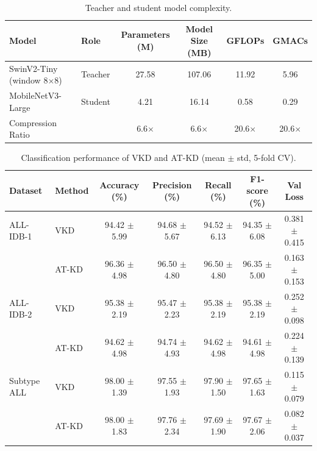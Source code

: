 \documentclass[preprint,review,12pt]{elsarticle}
\begin{document}
\begin{table}[tbp]
\centering
\caption{Teacher and student model complexity.}
\label{tab:complexity}
\footnotesize
\renewcommand{\arraystretch}{1.2}
\setlength{\tabcolsep}{3pt}
\begin{tabular}{l l c c c c}
\toprule
\textbf{Model} & \textbf{Role} & \textbf{Parameters (M)} & \textbf{Model Size (MB)} & \textbf{GFLOPs} & \textbf{GMACs} \\
\midrule
SwinV2-Tiny (window 8$\times$8) & Teacher & 27.58 & 107.06 & 11.92 & 5.96 \\
MobileNetV3-Large & Student & 4.21 & 16.14 & 0.58 & 0.29 \\
Compression Ratio &  & 6.6$\times$ & 6.6$\times$ & 20.6$\times$ & 20.6$\times$ \\
\bottomrule
\end{tabular}
\end{table}
\begin{table}[tbp]
\centering
\caption{Classification performance of VKD and AT-KD (mean $\pm$ std, 5-fold CV).}
\label{tab:perf}
\footnotesize
\renewcommand{\arraystretch}{1.2}
\setlength{\tabcolsep}{3pt}
\begin{tabular}{l l c c c c c}
\toprule
\textbf{Dataset} & \textbf{Method} & \textbf{Accuracy (\%)} & \textbf{Precision (\%)} & \textbf{Recall (\%)} & \textbf{F1-score (\%)} & \textbf{Val Loss} \\
\midrule
ALL-IDB-1 & VKD & 94.42 $\pm$ 5.99 & 94.68 $\pm$ 5.67 & 94.52 $\pm$ 6.13 & 94.35 $\pm$ 6.08 & 0.381 $\pm$ 0.415 \\
 & AT-KD & 96.36 $\pm$ 4.98 & 96.50 $\pm$ 4.80 & 96.50 $\pm$ 4.80 & 96.35 $\pm$ 5.00 & 0.163 $\pm$ 0.153 \\
ALL-IDB-2 & VKD & 95.38 $\pm$ 2.19 & 95.47 $\pm$ 2.23 & 95.38 $\pm$ 2.19 & 95.38 $\pm$ 2.19 & 0.252 $\pm$ 0.098 \\
 & AT-KD & 94.62 $\pm$ 4.98 & 94.74 $\pm$ 4.93 & 94.62 $\pm$ 4.98 & 94.61 $\pm$ 4.98 & 0.224 $\pm$ 0.139 \\
Subtype ALL & VKD & 98.00 $\pm$ 1.39 & 97.55 $\pm$ 1.93 & 97.90 $\pm$ 1.50 & 97.65 $\pm$ 1.63 & 0.115 $\pm$ 0.079 \\
 & AT-KD & 98.00 $\pm$ 1.83 & 97.76 $\pm$ 2.34 & 97.69 $\pm$ 1.90 & 97.67 $\pm$ 2.06 & 0.082 $\pm$ 0.037 \\
\bottomrule
\end{tabular}
\end{table}
\end{document}
